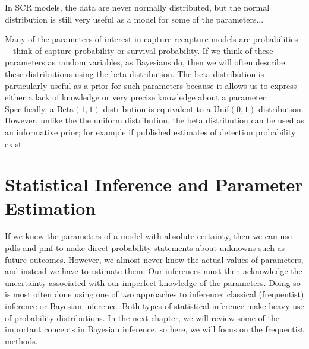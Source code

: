 In SCR models, the data are never normally distributed, but the normal
distribution is still very useful as a model for some of the
parameters...


Many of the parameters of interest in capture-recapture models are
probabilities---think of capture probability or survival
probability. If we think of these parameters as random variables,
as Bayesians do, then we will often describe these distributions using
the beta distribution. The beta distribution is particularly useful as
a prior for such parameters because it allows us to express either a
lack of knowledge or very precise knowledge about a
parameter. Specifically, a $\text{Beta}(1,1)$ distribution is
equivalent to a $\text{Unif}(0, 1)$ distribution. However, unlike the
the uniform distribution, the beta distribution can be used as an
informative prior; for example if published estimates of detection
probability exist.








\section{Statistical Inference and Parameter Estimation}

If we knew the parameters of a model with absolute certainty, then
we can use pdfs and pmf to make direct
probability statements about unknowns such as future outcomes. However, we
almost never know the actual values of parameters, and instead we have
to estimate them. Our inferences must then acknowledge the uncertainty
associated with our imperfect knowledge of the parameters. Doing so is
most often done using one of two approaches to inference:
classical (frequentist) inference or Bayesian
inference. Both types of statistical inference make heavy use of
probability distributions. In the next chapter, we will review some of
the important concepts in Bayesian inference, so here, we will
focus on the frequentist methods.

